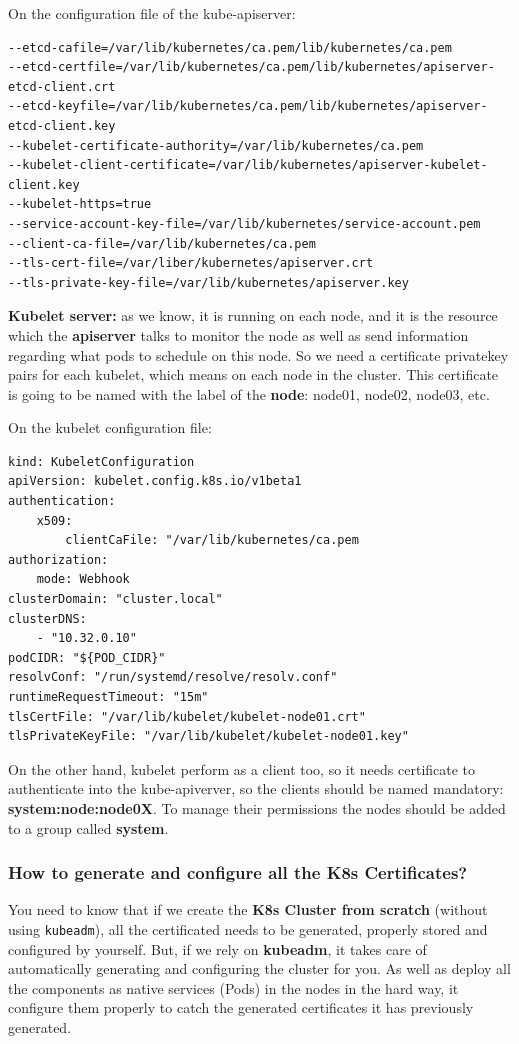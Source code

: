 \documentclass{article}
\newenvironment{codetemplate}[1][]{%
  \mybasecolorbox[#1]
  \itshape
}{%
  \endmybasecolorbox
}
\begin{document}
On the configuration file of the kube-apiserver:
\begin{codetemplate}{}
\begin{verbatim}
--etcd-cafile=/var/lib/kubernetes/ca.pem/lib/kubernetes/ca.pem
--etcd-certfile=/var/lib/kubernetes/ca.pem/lib/kubernetes/apiserver-etcd-client.crt
--etcd-keyfile=/var/lib/kubernetes/ca.pem/lib/kubernetes/apiserver-etcd-client.key
--kubelet-certificate-authority=/var/lib/kubernetes/ca.pem
--kubelet-client-certificate=/var/lib/kubernetes/apiserver-kubelet-client.key
--kubelet-https=true
--service-account-key-file=/var/lib/kubernetes/service-account.pem
--client-ca-file=/var/lib/kubernetes/ca.pem
--tls-cert-file=/var/liber/kubernetes/apiserver.crt
--tls-private-key-file=/var/lib/kubernetes/apiserver.key
\end{verbatim}
\end{codetemplate}

\textbf{Kubelet server:} as we know, it is running on each node, and it is the resource which the \textbf{apiserver}
talks to monitor the node as well as send information regarding what pods to schedule on this node. So we need a certificate privatekey pairs for each kubelet,
which means on each node in the cluster. This certificate is going to be named with the label of the \textbf{node}: node01, node02, node03, etc.

On the kubelet configuration file:
\begin{codetemplate}{}
\begin{verbatim}
kind: KubeletConfiguration
apiVersion: kubelet.config.k8s.io/v1beta1
authentication:
    x509:
        clientCaFile: "/var/lib/kubernetes/ca.pem
authorization:
    mode: Webhook
clusterDomain: "cluster.local"
clusterDNS:
    - "10.32.0.10"
podCIDR: "${POD_CIDR}"
resolvConf: "/run/systemd/resolve/resolv.conf"
runtimeRequestTimeout: "15m"
tlsCertFile: "/var/lib/kubelet/kubelet-node01.crt"
tlsPrivateKeyFile: "/var/lib/kubelet/kubelet-node01.key"
\end{verbatim}
\end{codetemplate}

On the other hand, kubelet perform as a client too, so it needs certificate to authenticate into the kube-apiverver, so the clients should be named mandatory: \textbf{system:node:node0X}. To manage their permissions the nodes should be added to a group called \textbf{system}.

\subsubsection{How to generate and configure all the K8s Certificates?}
You need to know that if we create the \textbf{K8s Cluster from scratch} (without using \verb|kubeadm|), all the certificated needs to be generated, properly stored and configured by yourself.
But, if we rely on \textbf{kubeadm}, it takes care of automatically generating and configuring the cluster for you.
As well as deploy all the components as native services (Pods) in the nodes in the hard way, it configure them properly to catch the generated certificates it has previously generated.
\end{document}
